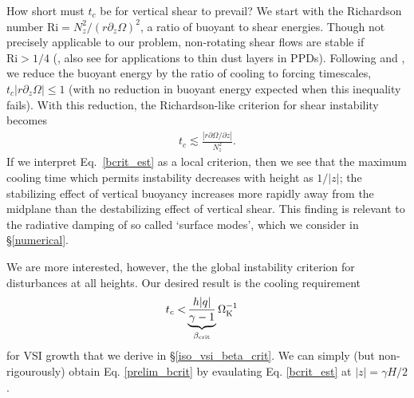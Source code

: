 \documentclass[iop, numberedappendix]{emulateapj}
\newcommand{\p}{\partial}
\def \OmK {\Omega_{\rm K}}
\begin{document}
How short must $t_c$ be for vertical shear to prevail?  We start with 
 the Richardson number $\mathrm{Ri} = N_z^2/(r\p_z\Omega)^2$, a 
ratio of buoyant to shear energies.  Though not precisely applicable to our problem,
non-rotating shear flows are stable if $\mathrm{Ri} > 1/4$ (\citealp{chandrasekhar61}, 
also see \citealp{ys02, lee10} for applications to thin dust layers in PPDs).
Following \cite{urpin03} and \cite{townsend58},  we reduce the buoyant energy by the 
ratio of cooling to forcing timescales, $t_c |r \p_z\Omega| \leq 1$ (with no reduction in buoyant energy 
expected when this inequality fails).  With this reduction, the Richardson-like criterion for 
shear instability becomes  \citep{urpin03}
\begin{align}\label{bcrit_est}
  t_c \lesssim \frac{\left|r\p\Omega/\p z\right|} {N_z^2}.
\end{align}
If we interpret Eq.\ \ref{bcrit_est} as a local criterion, then we see that 
the maximum cooling time which permits instability decreases with height as $1/|z|$;  
the stabilizing effect of vertical buoyancy increases more rapidly away from
the midplane than the destabilizing effect of vertical shear.  
This finding is relevant to the radiative damping of so called `surface 
modes', which we consider in \S\ref{numerical}.

We are more interested, however, the the global instability criterion for disturbances at all heights.
Our desired result 
is the cooling requirement 
\begin{align}\label{prelim_bcrit}
  t_c <  &\underbrace{\frac{h |q| }{\gamma - 1}}_{\beta_\mathrm{crit}}\OmK^{-1}
\end{align}   
for VSI growth that we derive in \S\ref{iso_vsi_beta_crit}.  We can simply 
(but non-rigourously) obtain Eq. \ref{prelim_bcrit}
  by evaulating  Eq. \ref{bcrit_est} at $|z|=\gamma H/2$. %

\end{document}
